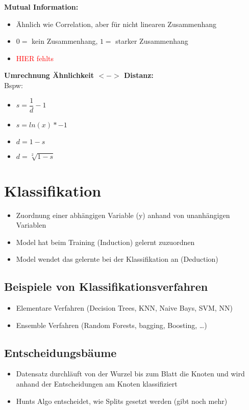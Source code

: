 \documentclass[a4paper]{article}
\begin{document}
\begin{landscape}
\begin{multicols}{3}
            \textbf{Mutual Information:}
            \begin{itemize}[noitemsep,nolistsep]
                \item Ähnlich wie Correlation, aber für nicht linearen Zusammenhang
                \item $0 =$ kein Zusammenhang, $1 =$ starker Zusammenhang
                \item \textcolor{red}{HIER fehlts}
            \end{itemize}
            
            \textbf{Umrechnung Ähnlichkeit $<->$ Distanz:}\\
            Bspw:
            \begin{itemize}[noitemsep,nolistsep]
                \item $s = \dfrac{1}{d}-1$
                \item $s = ln(x)*-1$
                \item $d = 1 - s$
                \item $d = \sqrt[2]{1-s}$
            \end{itemize}

    \section{Klassifikation}
            \begin{itemize}[noitemsep,nolistsep]
                \item Zuordnung einer abhängigen Variable (y) anhand von unanhängigen Variablen
                \item Model hat beim Training (Induction) gelernt zuzuordnen
                \item Model wendet das gelernte bei der Klassifikation an (Deduction)
            \end{itemize}
        \subsection{Beispiele von Klassifikationsverfahren}
        \begin{itemize}[noitemsep,nolistsep]
            \item Elementare Verfahren (Decision Trees, KNN, Naive Bays, SVM, NN)
            \item Ensemble Verfahren (Random Forests, bagging, Boosting, \dots)
        \end{itemize}
        \subsection{Entscheidungsbäume}
        \begin{itemize}[noitemsep,nolistsep]
            \item Datensatz durchläuft von der Wurzel bis zum Blatt die Knoten und wird anhand der Entscheidungen am Knoten klassifiziert
            \item Hunts Algo entscheidet, wie Splits gesetzt werden (gibt noch mehr)
        \end{itemize}

\end{multicols}
\end{landscape}
\end{document}

